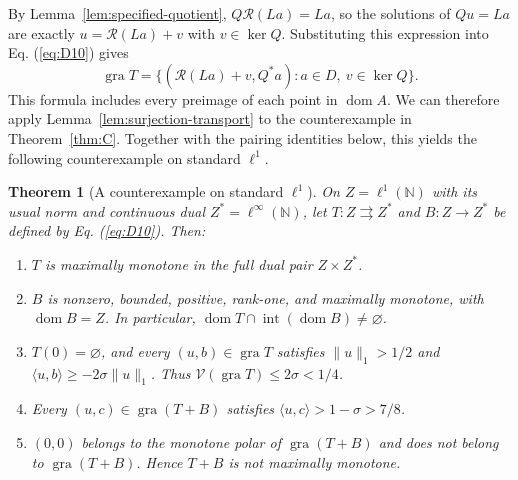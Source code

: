 \documentclass[11pt]{article}
\newcommand{\N}{\mathbb N}
\newcommand{\gra}{\operatorname{gra}}
\newcommand{\dom}{\operatorname{dom}}
\newcommand{\pair}[2]{\langle #1,#2\rangle}
\newtheorem{theorem}{Theorem}
\theoremstyle{definition}
\theoremstyle{remark}
\begin{document}
By Lemma~\ref{lem:specified-quotient}, $Q\mathcal R(La)=La$, so the solutions of $Qu=La$ are exactly $u=\mathcal R(La)+v$ with $v\in\ker Q$. Substituting this expression into Eq. (\ref{eq:D10}) gives
\begin{equation}
\gra T=\{(\mathcal R(La)+v,Q^*a):a\in D,\ v\in\ker Q\}.
\label{eq:L4}
\end{equation}
This formula includes every preimage of each point in $\dom A$. We can therefore apply Lemma~\ref{lem:surjection-transport} to the counterexample in Theorem~\ref{thm:C}. Together with the pairing identities below, this yields the following counterexample on standard $\ell^1$.


\begin{theorem}[A counterexample on standard $\ell^1$]\label{thm:L}
On $Z=\ell^1(\N)$ with its usual norm and continuous dual $Z^*=\ell^\infty(\N)$, let $T:Z\rightrightarrows Z^*$ and $B:Z\to Z^*$ be defined by Eq. (\ref{eq:D10}). Then:
\begin{enumerate}
\item\label{thm:L-maximality} $T$ is maximally monotone in the full dual pair $Z\times Z^*$.
\item\label{thm:L-partner} $B$ is nonzero, bounded, positive, rank-one, and maximally monotone,
with $\dom B=Z$. In particular, $\dom T\cap\operatorname{int}(\dom B)\ne\varnothing$.
\item\label{thm:L-bound} $T(0)=\varnothing$, and every $(u,b)\in\gra T$ satisfies
$\|u\|_1>1/2$ and $\pair{u}{b}\ge-2\sigma\|u\|_1$. Thus $\mathcal V(\gra T)\le2\sigma<1/4$.
\item\label{thm:L-pairing} Every $(u,c)\in\gra(T+B)$ satisfies
$\pair{u}{c}>1-\sigma>7/8$.
\item\label{thm:L-sum} $(0,0)$ belongs to the monotone polar of $\gra(T+B)$ and does
not belong to $\gra(T+B)$. Hence $T+B$ is not maximally monotone.
\end{enumerate}
\end{theorem}
\end{document}
